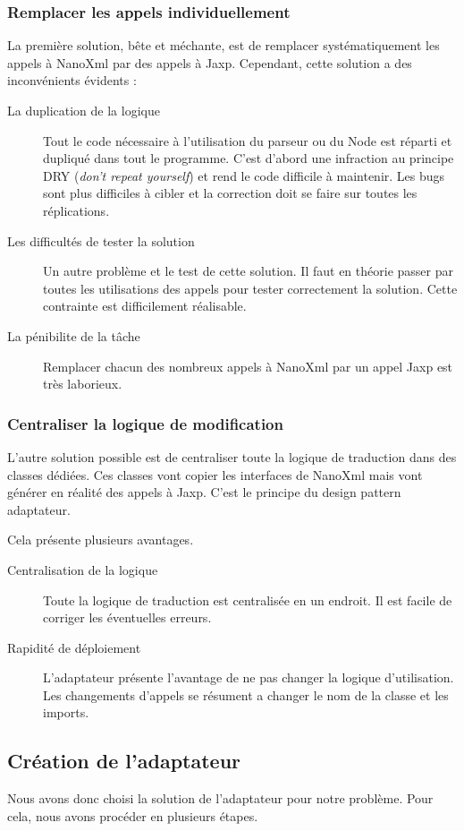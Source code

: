 \subsubsection{Remplacer les appels individuellement}
La première solution, bête et méchante, est de remplacer systématiquement les appels à NanoXml par des appels à Jaxp.
Cependant, cette solution a des inconvénients évidents :
\begin{description}
\item[La duplication de la logique] Tout le code nécessaire à l'utilisation du parseur ou du Node est réparti et dupliqué dans tout le programme.
C'est d'abord une infraction au principe DRY (\textit{don't repeat yourself}) et rend le code difficile à maintenir.
Les bugs sont plus difficiles à cibler et la correction doit se faire sur toutes les réplications.
\item[Les difficultés de tester la solution] Un autre problème et le test de cette solution.
Il faut en théorie passer par toutes les utilisations des appels pour tester correctement la solution. Cette contrainte est difficilement réalisable.
\item[La pénibilite de la tâche] Remplacer chacun des nombreux appels à NanoXml par un appel Jaxp est très laborieux.
\end{description}
\subsubsection{Centraliser la logique de modification}
L'autre solution possible est de centraliser toute la logique de traduction dans des classes dédiées.
Ces classes vont copier les interfaces de NanoXml mais vont générer en réalité des appels à Jaxp.
C'est le principe du design pattern adaptateur.

Cela présente plusieurs avantages.
\begin{description}
\item[Centralisation de la logique] Toute la logique de traduction est centralisée en un endroit. Il est facile de corriger les éventuelles erreurs.
\item[Rapidité de déploiement] L'adaptateur présente l'avantage de ne pas changer la logique d'utilisation. Les changements d'appels se résument a changer le nom de la classe et les imports.
\end{description}
\subsection{Création de l'adaptateur}
Nous avons donc choisi la solution de l'adaptateur pour notre problème. Pour cela, nous avons procéder en plusieurs étapes.
